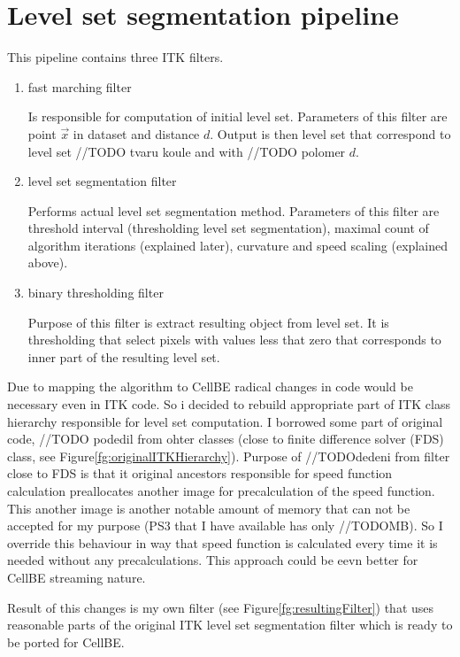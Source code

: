 \section{Level set segmentation pipeline}

This pipeline contains three ITK filters.
\begin{enumerate}
  \item{fast marching filter}
  \par
  Is responsible for computation of initial level set. Parameters of this filter are point $\vec{x}$ in dataset and distance $d$. Output is then level set that correspond to level set //TODO tvaru koule and with //TODO polomer $d$.

  \item{level set segmentation filter}
  \par
  Performs actual level set segmentation method. Parameters of this filter are threshold interval (thresholding level set segmentation),  maximal count of algorithm iterations (explained later), curvature and speed scaling (explained above).

  \item{binary thresholding filter}
  \par
  Purpose of this filter is extract resulting object from level set. It is thresholding that select pixels with values less that zero that corresponds to inner part of the resulting level set.
\end{enumerate}

Due to mapping the algorithm to CellBE radical changes in code would be necessary even in ITK code. So i decided to rebuild appropriate part of ITK class hierarchy responsible for level set computation. I borrowed some part of original code, //TODO podedil from ohter classes (close to finite difference solver (FDS) class, see Figure\ref{fg:originalITKHierarchy}). Purpose of //TODOdedeni from filter close to FDS is that it original ancestors responsible for speed function calculation preallocates another image for precalculation of the speed function. This another image is another notable amount of memory that can not be accepted for my purpose (PS3 that I have available has only //TODOMB). So I override this behaviour in way that speed function is calculated every time it is needed without any precalculations. This approach could be eevn better for CellBE streaming nature. 

Result of this changes is my own filter (see Figure\ref{fg:resultingFilter}) that uses reasonable parts of the original ITK level set segmentation filter which is ready to be ported for CellBE.

